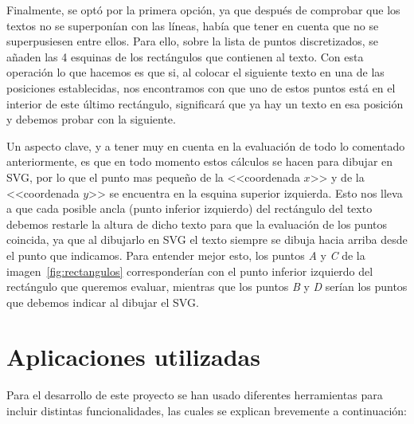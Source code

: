 Finalmente, se optó por la primera opción, ya que después de comprobar que los textos no se superponían con las líneas, había que tener en cuenta que no se superpusiesen entre ellos. Para ello, sobre la lista de puntos discretizados, se añaden las 4 esquinas de los rectángulos que contienen al texto. Con esta operación lo que hacemos es que si, al colocar el siguiente texto en una de las posiciones establecidas, nos encontramos con que uno de estos puntos está en el interior de este último rectángulo, significará que ya hay un texto en esa posición y debemos probar con la siguiente.

Un aspecto clave, y a tener muy en cuenta en la evaluación de todo lo comentado anteriormente, es que en todo momento estos cálculos se hacen para dibujar en SVG, por lo que el punto mas pequeño de la <<coordenada $x$>> y de la <<coordenada $y$>> se encuentra en la esquina superior izquierda. Esto nos lleva a que cada posible ancla (punto inferior izquierdo) del rectángulo del texto debemos restarle la altura de dicho texto para que la evaluación de los puntos coincida, ya que al dibujarlo en SVG el texto siempre se dibuja hacia arriba desde el punto que indicamos. Para entender mejor esto, los puntos \textit{A} y \textit{C} de la imagen~\ref{fig:rectangulos} corresponderían con el punto inferior izquierdo del rectángulo que queremos evaluar, mientras que los puntos \textit{B} y \textit{D} serían los puntos que debemos indicar al dibujar el SVG.


\section{Aplicaciones utilizadas}
Para el desarrollo de este proyecto se han usado diferentes herramientas para incluir distintas funcionalidades, las cuales se explican brevemente a continuación:


